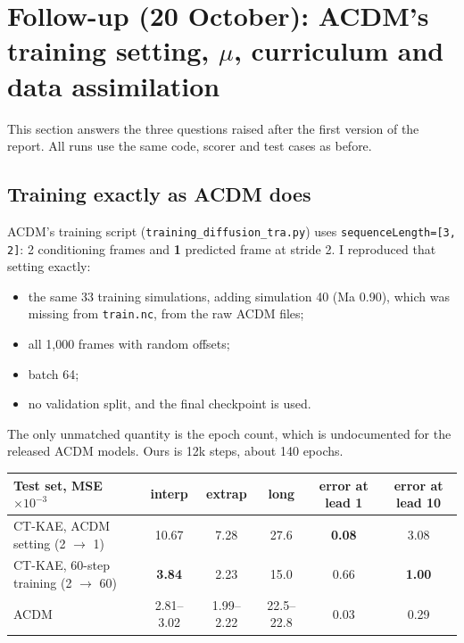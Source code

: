 \section{Follow-up (20 October): ACDM's training setting, $\mu$, curriculum and data assimilation}\label{sec:followup}

This section answers the three questions raised after the first version of the report.
All runs use the same code, scorer and test cases as before.

\subsection{Training exactly as ACDM does}\label{sec:acdmsetting}

ACDM's training script (\texttt{training\_diffusion\_tra.py}) uses \texttt{sequenceLength=[3, 2]}:
2 conditioning frames and \textbf{1} predicted frame at stride 2. I reproduced that setting
exactly:
\begin{itemize}
\item the same 33 training simulations, adding simulation 40 (Ma 0.90), which was missing
  from \texttt{train.nc}, from the raw ACDM files;
\item all 1{,}000 frames with random offsets;
\item batch 64;
\item no validation split, and the final checkpoint is used.
\end{itemize}
The only unmatched quantity is the epoch count, which is undocumented for the released ACDM
models. Ours is 12k steps, about 140 epochs.

\begin{center}\small
\begin{tabular}{lccccc}
\toprule
Test set, MSE $\times10^{-3}$ & interp & extrap & long & error at lead 1 & error at lead 10\\
\midrule
CT-KAE, ACDM setting (2 $\to$ 1)       & 10.67 & 7.28 & 27.6 & \textbf{0.08} & 3.08\\
CT-KAE, 60-step training (2 $\to$ 60)  & \textbf{3.84} & 2.23 & 15.0 & 0.66 & \textbf{1.00}\\
ACDM                                   & 2.81--3.02 & 1.99--2.22 & 22.5--22.8 & 0.03 & 0.29\\
\bottomrule
\end{tabular}
\end{center}

